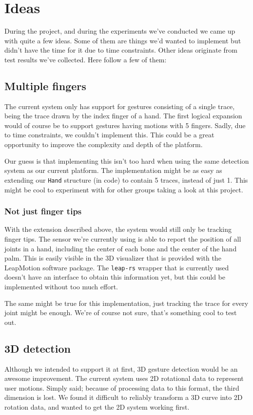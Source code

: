 \documentclass[a4paper]{article}
\begin{document}
  \clearpage

  \section{Ideas}
  During the project, and during the experiments we've conducted we came up with
  quite a few ideas. Some of them are things we'd wanted to implement but didn't
  have the time for it due to time constraints. Other ideas originate from
  test results we've collected.
  Here follow a few of them:

  \subsection{Multiple fingers}
  The current system only has support for gestures consisting of a single trace,
  being the trace drawn by the index finger of a hand. The first logical
  expansion would of course be to support gestures having motions with 5
  fingers. Sadly, due to time constraints, we couldn't implement this. This
  could be a great opportunity to improve the complexity and depth of the
  platform.

  Our guess is that implementing this isn't too hard when using the same
  detection system as our current platform. The implementation might be as easy
  as extending our \verb_Hand_ structure (in code) to contain 5 traces, instead
  of just 1. This might be cool to experiment with for other groups taking a
  look at this project.

  \subsubsection{Not just finger tips}
  With the extension described above, the system would still only be tracking
  finger tips. The sensor we're currently using is able to report the position
  of all joints in a hand, including the center of each bone and the center of
  the hand palm. This is easily visible in the 3D visualizer that is provided
  with the LeapMotion software package. The \verb_leap-rs_ wrapper that is
  currently used doesn't have an interface to obtain this information yet,
  but this could be implemented without too much effort.

  The same might be true for this implementation, just tracking the trace for
  every joint might be enough. We're of course not sure, that's something cool
  to test out.

  \subsection{3D detection}
  Although we intended to support it at first, 3D gesture detection would be an
  awesome improvement. The current system uses 2D rotational data to represent
  user motions. Simply said; because of processing data to this format, the
  third dimension is lost. We found it difficult to reliably transform a 3D
  curve into 2D rotation data, and wanted to get the 2D system working first.
\end{document}
